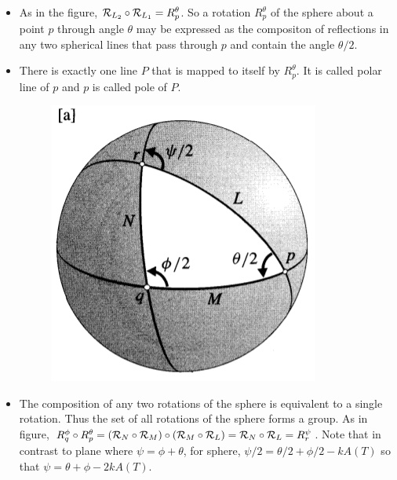 \documentclass[12pt]{article}
\def\mc{\ensuremath\mathcal}
\begin{document}
\begin{itemize}
    \item As in the figure, $\mc{R}_{L_2}\circ \mc{R}_{L_1} = R_{p}^{\theta}$. So a rotation $R^{\theta}_{p}$ of the sphere about a point $p$ through angle $\theta$ may be expressed as the compositon of reflections in any two spherical lines that pass through $p$ and contain the angle $\theta/2$.
    
    \item There is exactly one line $P$ that is mapped to itself by $R^{\theta}_{p}$. It is called polar line of $p$ and $p$ is called pole of $P$.

    \begin{figure}[h!]
        \centering
        \includegraphics[scale=0.7]{fig_6}
        \label{fig_6}
    \end{figure}
    
    \item The composition of any two rotations of the sphere is equivalent to a single rotation. Thus the set of all rotations of the sphere forms a group. As in figure, $R^{\phi}_{q}\circ R^{\theta}_{p} = (\mc{R}_{N} \circ \mc{R}_{M}) \circ (\mc{R}_{M} \circ \mc{R}_{L}) = \mc{R}_{N} \circ \mc{R}_{L} = R_{r}^{\psi}$. Note that in contrast to plane where $\psi = \phi+\theta$, for sphere, $\psi/2 = \theta/2+\phi/2-kA(T)$ so that $\psi = \theta+\phi-2kA(T)$.


\end{itemize}
\end{document}
